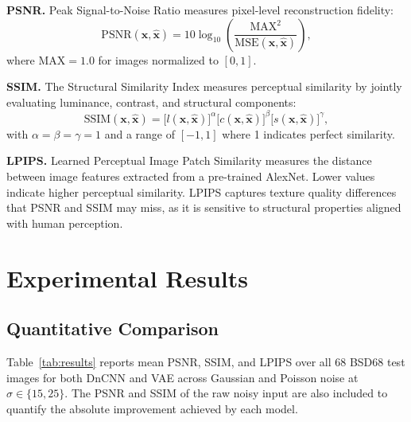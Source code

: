 \documentclass[conference]{IEEEtran}
\begin{document}
\textbf{PSNR.} Peak Signal-to-Noise Ratio measures pixel-level
reconstruction fidelity:
\begin{equation}
  \text{PSNR}(\mathbf{x}, \hat{\mathbf{x}}) =
    10\log_{10}\!\left(\frac{\text{MAX}^2}{\text{MSE}(\mathbf{x}, \hat{\mathbf{x}})}\right),
\end{equation}
where \(\text{MAX} = 1.0\) for images normalized to \([0,1]\).

\textbf{SSIM.} The Structural Similarity Index measures perceptual
similarity by jointly evaluating luminance, contrast, and structural
components:
\begin{equation}
  \text{SSIM}(\mathbf{x}, \hat{\mathbf{x}}) =
    \bigl[l(\mathbf{x},\hat{\mathbf{x}})\bigr]^\alpha
    \bigl[c(\mathbf{x},\hat{\mathbf{x}})\bigr]^\beta
    \bigl[s(\mathbf{x},\hat{\mathbf{x}})\bigr]^\gamma,
\end{equation}
with \(\alpha = \beta = \gamma = 1\) and a range of \([-1, 1]\) where
1 indicates perfect similarity.

\textbf{LPIPS.} Learned Perceptual Image Patch Similarity
\cite{zhang2018lpips} measures the distance between image features
extracted from a pre-trained AlexNet. Lower values indicate higher
perceptual similarity. LPIPS captures texture quality differences that
PSNR and SSIM may miss, as it is sensitive to structural properties
aligned with human perception.

\section{Experimental Results}

\subsection{Quantitative Comparison}

Table~\ref{tab:results} reports mean PSNR, SSIM, and LPIPS over all 68
BSD68 test images for both DnCNN and VAE across Gaussian and Poisson
noise at \(\sigma \in \{15, 25\}\). The PSNR and SSIM of the raw noisy
input are also included to quantify the absolute improvement achieved by
each model.
\end{document}
